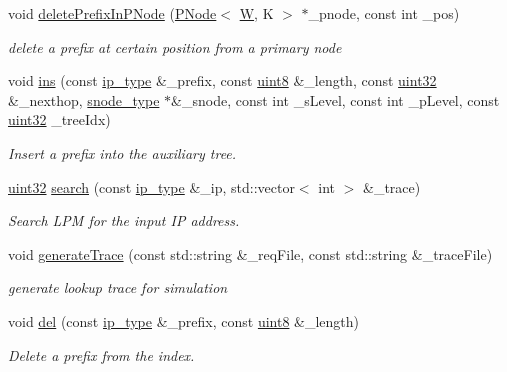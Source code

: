 \begin{DoxyCompactItemize}
void \hyperlink{classRMPTree_abf994ca8e073378dc4a643b1d9c1cfc7}{delete\-Prefix\-In\-P\-Node} (\hyperlink{structPNode}{P\-Node}$<$ \hyperlink{test__u128_8cpp_ab21b528bc38899d04d3a7053e52fb797}{W}, K $>$ $\ast$\-\_\-pnode, const int \-\_\-pos)
\begin{DoxyCompactList}\small\item\em delete a prefix at certain position from a primary node \end{DoxyCompactList}\item 
void \hyperlink{classRMPTree_af26712b559e84c21ee0f3d03ee89bf6b}{ins} (const \hyperlink{classRMPTree_a3dc76d54f334071d8a2bac2422db0159}{ip\-\_\-type} \&\-\_\-prefix, const \hyperlink{types_8h_a34ecedcf03a70dc91e4616212d79267d}{uint8} \&\-\_\-length, const \hyperlink{types_8h_abd01e8e67e3d94cab04ecaaf4f85ac1b}{uint32} \&\-\_\-nexthop, \hyperlink{classRMPTree_ade23f0b765f589613fe10d6cbab738e2}{snode\-\_\-type} $\ast$\&\-\_\-snode, const int \-\_\-s\-Level, const int \-\_\-p\-Level, const \hyperlink{types_8h_abd01e8e67e3d94cab04ecaaf4f85ac1b}{uint32} \-\_\-tree\-Idx)
\begin{DoxyCompactList}\small\item\em Insert a prefix into the auxiliary tree. \end{DoxyCompactList}\item 
\hyperlink{types_8h_abd01e8e67e3d94cab04ecaaf4f85ac1b}{uint32} \hyperlink{classRMPTree_aba048ea59e12faeac571ef5895feb55d}{search} (const \hyperlink{classRMPTree_a3dc76d54f334071d8a2bac2422db0159}{ip\-\_\-type} \&\-\_\-ip, std\-::vector$<$ int $>$ \&\-\_\-trace)
\begin{DoxyCompactList}\small\item\em Search L\-P\-M for the input I\-P address. \end{DoxyCompactList}\item 
void \hyperlink{classRMPTree_aeb968111f77661b1e7dc46b2d00bb947}{generate\-Trace} (const std\-::string \&\-\_\-req\-File, const std\-::string \&\-\_\-trace\-File)
\begin{DoxyCompactList}\small\item\em generate lookup trace for simulation \end{DoxyCompactList}\item 
void \hyperlink{classRMPTree_ad48e9bf6f019b2ae704f61a885c96cd7}{del} (const \hyperlink{classRMPTree_a3dc76d54f334071d8a2bac2422db0159}{ip\-\_\-type} \&\-\_\-prefix, const \hyperlink{types_8h_a34ecedcf03a70dc91e4616212d79267d}{uint8} \&\-\_\-length)
\begin{DoxyCompactList}\small\item\em Delete a prefix from the index. \end{DoxyCompactList}\item 

\end{DoxyCompactItemize}

